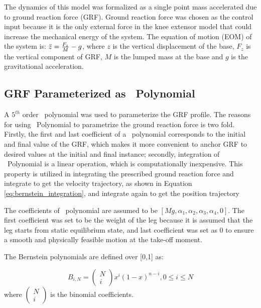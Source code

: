 The dynamics of this model was formalized as a single point mass accelerated due to ground reaction force (GRF). Ground reaction force was chosen as the control input because it is the only external force in the knee extensor model that could increase the mechanical energy of the system. The equation of motion (EOM) of the system is: ${\ddot{z}} = \frac{F_z}{M}-g$, where $z$ is the vertical displacement of the base, $F_z$ is the vertical component of GRF, $M$ is the lumped mass at the base and $g$ is the gravitational acceleration. 

\subsection{GRF Parameterized as \Bezier\ Polynomial}
\label{sec:BezierPoly}
	
A $5^{th}$ order \Bezier\ polynomial was used to parameterize the GRF profile. The reasons for using \Bezier\ Polynomial to parametrize the ground reaction force is two fold. Firstly, the first and last coefficient of a \Bezier\ polynomial corresponds to the initial and final value of the GRF, which makes it more convenient to anchor GRF to desired values at the initial and final instance; secondly, integration of \Bezier\ Polynomial is a linear operation, which is computationally inexpensive. This property is utilized in integrating the prescribed ground reaction force and integrate to get the velocity trajectory, as shown in Equation \ref{eq:bernstein_integration}, and integrate again to get the position trajectory

The coefficients of \Bezier\ polynomial are assumed to be $[Mg, \alpha_1, \alpha_2, \alpha_3, \alpha_4, 0]$. The first coefficient was set to be the weight of the leg because it is assumed that the leg starts from static equilibrium state, and last coefficient was set as $0$ to ensure a smooth and physically feasible motion at the take-off moment.  

The Bernstein polynomials are defined over [0,1] as:

\begin{equation}
	B_{i,N} = \left(
	\begin{smallmatrix}
	N\\
	i
	\end{smallmatrix}\right)
	x^i(1-x)^{n-i},
	0\leq i \leq N
\end{equation}
where  $\left(
\begin{smallmatrix}
N\\
i
\end{smallmatrix}\right)$
is the binomial coefficients.

